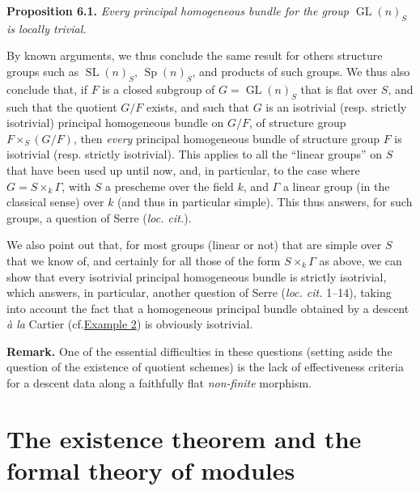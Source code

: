 \documentclass{article}
\newenvironment{itenv}[1]
  {\phantomsection\par\smallskip\noindent\textbf{#1.}\itshape}
  {\par\smallskip}
\newenvironment{rmenv}[1]
  {\phantomsection\par\smallskip\noindent\textbf{#1.}\rmfamily}
  {\par\smallskip}
\theoremstyle{definition}
\theoremstyle{definition}
\theoremstyle{definition}
\theoremstyle{definition}
\theoremstyle{remark}
\begin{document}
\leavevmode{}%
\begin{itenv}{Proposition 6.1}
Every principal homogeneous bundle for the group \(\operatorname{GL}(n)_S\) is locally trivial.

\end{itenv}

By known arguments, we thus conclude the same result for others structure groups such as \(\operatorname{SL}(n)_S\), \(\operatorname{Sp}(n)_S\), and products of such groups.
We thus also conclude that, if \(F\) is a closed subgroup of \(G=\operatorname{GL}(n)_S\) that is flat over \(S\), and such that the quotient \(G/F\) exists, and such that \(G\) is an isotrivial (resp. strictly isotrivial) principal homogeneous bundle on \(G/F\), of structure group \(F\times_S(G/F)\), then \emph{every} principal homogeneous bundle of structure group \(F\) is isotrivial (resp. strictly isotrivial).
This applies to all the ``linear groups'' on \(S\) that have been used up until now, and, in particular, to the case where \(G=S\times_k\Gamma\), with \(S\) a prescheme over the field \(k\), and \(\Gamma\) a linear group (in the classical sense) over \(k\) (and thus in particular simple).
This thus answers, for such groups, a question of Serre (\emph{loc. cit.}).

We also point out that, for most groups (linear or not) that are simple over \(S\) that we know of, and certainly for all those of the form \(S\times_k\Gamma\) as above, we can show that every isotrivial principal homogeneous bundle is strictly isotrivial, which answers, in particular, another question of Serre (\emph{loc. cit.} 1--14), taking into account the fact that a homogeneous principal bundle obtained by a descent \emph{à la} Cartier (cf.\protect\hyperlink{fga-3-i-section-B.3-example-2}{Example 2}) is obviously isotrivial.

\begin{rmenv}{Remark}
One of the essential difficulties in these questions (setting aside the question of the existence of quotient schemes) is the lack of effectiveness criteria for a descent data along a faithfully flat \emph{non-finite} morphism.

\end{rmenv}

\hypertarget{fga-3.ii}{%
\section{The existence theorem and the formal theory of modules}\label{fga-3.ii}}
\end{document}
